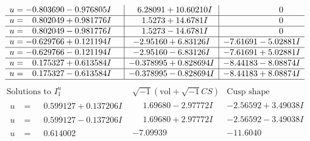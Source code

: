 \documentclass[1p]{elsarticle_modified}
\theoremstyle{definition}
\newcommand{\I}{\sqrt{-1}}
\begin{document}
$$\begin{array}{c|c|c}
\begin{aligned}
u &= -0.803690 - 0.976805 I\end{aligned}
 & \phantom{-}6.28091 + 10.60210 I & \phantom{-0.000000 } 0 \\ \hline\begin{aligned}
u &= \phantom{-}0.802049 + 0.981776 I\end{aligned}
 & \phantom{-}1.5273 + 14.6781 I & \phantom{-0.000000 } 0 \\ \hline\begin{aligned}
u &= \phantom{-}0.802049 - 0.981776 I\end{aligned}
 & \phantom{-}1.5273 - 14.6781 I & \phantom{-0.000000 } 0 \\ \hline\begin{aligned}
u &= -0.629766 + 0.121194 I\end{aligned}
 & -2.95160 + 6.83126 I & -7.61691 - 5.02881 I \\ \hline\begin{aligned}
u &= -0.629766 - 0.121194 I\end{aligned}
 & -2.95160 - 6.83126 I & -7.61691 + 5.02881 I \\ \hline\begin{aligned}
u &= \phantom{-}0.175327 + 0.613584 I\end{aligned}
 & -0.378995 + 0.828694 I & -8.44183 - 8.08874 I \\ \hline\begin{aligned}
u &= \phantom{-}0.175327 - 0.613584 I\end{aligned}
 & -0.378995 - 0.828694 I & -8.44183 + 8.08874 I\\
 \hline 
 \end{array}$$\newpage$$\begin{array}{c|c|c}  
\text{Solutions to }I^u_{1}& \I (\text{vol} + \sqrt{-1}CS) & \text{Cusp shape}\\
 \hline 
\begin{aligned}
u &= \phantom{-}0.599127 + 0.137206 I\end{aligned}
 & \phantom{-}1.69680 - 2.97772 I & -2.56592 + 3.49038 I \\ \hline\begin{aligned}
u &= \phantom{-}0.599127 - 0.137206 I\end{aligned}
 & \phantom{-}1.69680 + 2.97772 I & -2.56592 - 3.49038 I \\ \hline\begin{aligned}
u &= \phantom{-}0.614002\phantom{ +0.000000I}\end{aligned}
 & -7.09939\phantom{ +0.000000I} & -11.6040\phantom{ +0.000000I} \\ \hline\begin{aligned}

\end{aligned}
\end{array}$$
\end{document}
